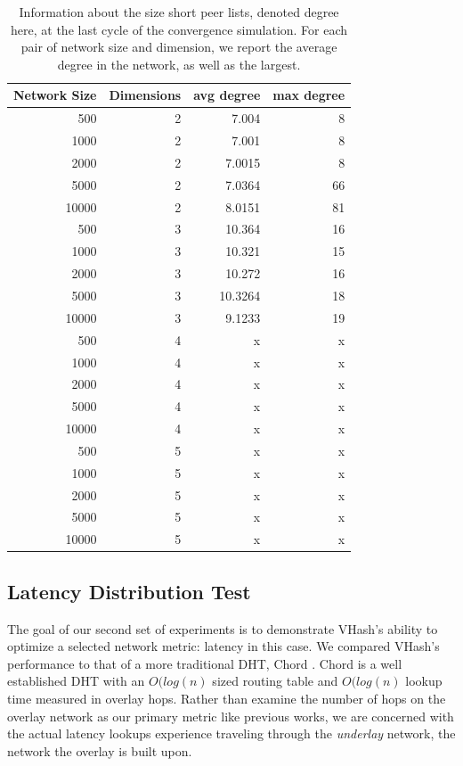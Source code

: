 \documentclass{IEEEtran}
\begin{document}
\begin{table}
\centering
\begin{tabular}{|r|r|r|r|}
\hline
Network Size & Dimensions & avg degree & max degree\\ \hline
500   & 2 & 7.004 & 8 \\ \hline
1000  & 2 & 7.001 & 8 \\ \hline
2000  & 2 & 7.0015 & 8 \\ \hline
5000  & 2 & 7.0364 & 66 \\ \hline
10000 & 2 & 8.0151 & 81\\ \hline  %
500   & 3 & 10.364 & 16 \\ \hline
1000  & 3 & 10.321 & 15 \\ \hline
2000  & 3 & 10.272 & 16 \\ \hline
5000  & 3 & 10.3264 & 18 \\ \hline
10000 & 3 & 9.1233 & 19 \\ \hline
500   & 4 & x & x \\ \hline
1000  & 4 & x & x \\ \hline
2000  & 4 & x & x \\ \hline
5000  & 4 & x & x \\ \hline
10000 & 4 & x & x \\ \hline
500   & 5 & x & x \\ \hline
1000  & 5 & x & x \\ \hline
2000  & 5 & x & x \\ \hline
5000  & 5 & x & x \\ \hline
10000 & 5 & x & x \\ \hline
\end{tabular}
\caption{Information about the size short peer lists, denoted degree here, at the last cycle of the convergence simulation.  For each pair of network size and dimension, we report the average degree in the network, as well as the largest.}
\label{tab:convtable}
\end{table}






\subsection{Latency Distribution Test}
The goal of our second set of experiments is to demonstrate VHash's ability to optimize a selected network metric: latency in this case.  
We compared VHash's performance to that of a more traditional DHT, Chord \cite{chord}.
Chord is a well established DHT with an $O(log(n)$ sized routing table and $O(log(n)$ lookup time measured in overlay hops.  
Rather than examine the number of hops on the overlay network as our primary metric like previous works, we are concerned with the actual latency lookups experience traveling through the \emph{underlay} network, the network the overlay is built upon.
\end{document}
